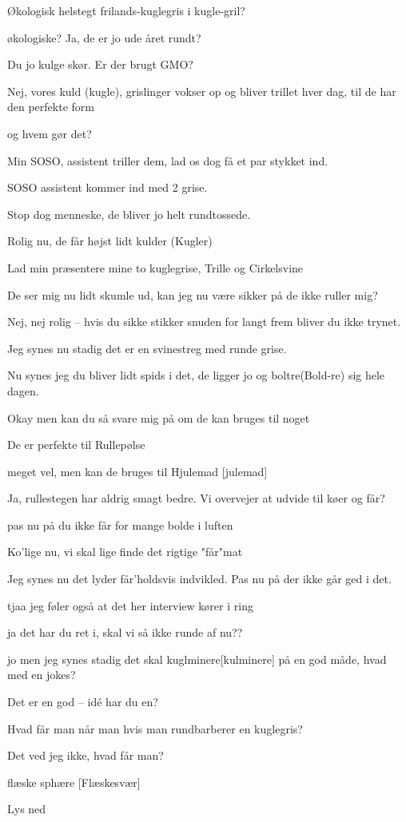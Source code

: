 \documentclass[a4paper,11pt]{article}
\begin{document}
\begin{sketch}
 Økologisk helstegt frilands-kuglegris i kugle-gril?

 økologiske? Ja, de er jo ude året rundt?

 Du jo kulge skør. Er der brugt GMO?

 Nej, vores kuld (kugle), grislinger vokser op og bliver trillet hver dag, til de har den perfekte form

 og hvem gør det?

 Min SOSO, assistent triller dem, lad os dog få et par stykket ind.

\scene SOSO assistent kommer ind med 2 grise. 

 Stop dog menneske, de bliver jo helt rundtossede.

 Rolig nu, de får højst lidt kulder (Kugler)

 Lad min præsentere mine to kuglegrise, Trille og Cirkelsvine

 De ser mig nu lidt skumle ud, kan jeg nu være sikker på de ikke ruller mig?

 Nej, nej rolig -- hvis du sikke stikker snuden for langt frem bliver du ikke trynet.

 Jeg synes nu stadig det er en svinestreg med runde grise.

 Nu synes jeg du bliver lidt spids i det, de ligger jo og boltre(Bold-re) sig hele dagen.

 Okay men kan du så svare mig på om de kan bruges til noget

 De er perfekte til Rullepølse

 meget vel, men kan de bruges til Hjulemad [julemad]

 Ja, rullestegen har aldrig smagt bedre. Vi overvejer at udvide til køer og får?

 pas nu på du ikke får for mange bolde i luften

 Ko'lige nu, vi skal lige finde det rigtige "får"mat

 Jeg synes nu det lyder får'holdsvis indvikled. Pas nu på der ikke går ged i det. 

 tjaa jeg føler også at det her interview kører i ring

 ja det har du ret i, skal vi så ikke runde af nu??

 jo men jeg synes stadig det skal kuglminere[kulminere] på en god måde, hvad med en jokes?

 Det er en god -- idé har du en?

 Hvad får man når man hvis man rundbarberer en kuglegris?

 Det ved jeg ikke, hvad får man?

 flæske sphære [Flæskesvær]






Lys ned

\end{sketch}
\end{document}
